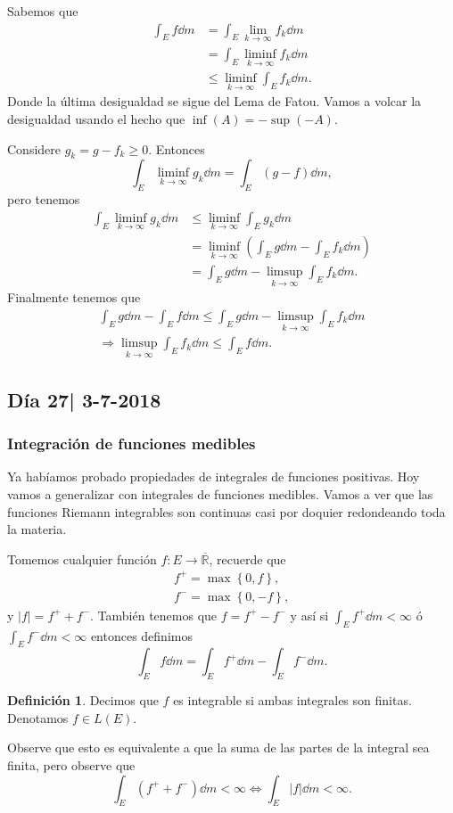 \documentclass[12pt]{article}
\theoremstyle{plain}
\theoremstyle{definition}
\newtheorem{Def}[Th]{Definición}       %
\theoremstyle{remark}
\numberwithin{equation}{section}
\newcommand{\bR}{\mathbb{R}}        %
\renewcommand{\geq}{\geqslant}      %
\renewcommand{\leq}{\leqslant}      %
\renewcommand{\:}{\colon}           %
\newcommand{\conj}[1]{\left\lbrace#1\right\rbrace}
\begin{document}
\begin{multicols}{2}
\begin{ptcbp}
Sabemos que
\begin{align*}
  \int_Ef\dd m &=\int_E\lim_{k\to\infty}f_k\dd m\\
  &=\int_E\liminf_{k\to\infty}f_k\dd m\\
  &\leq \liminf_{k\to\infty}\int_E f_k\dd m.
\end{align*}
Donde la última desigualdad se sigue del Lema de Fatou. Vamos a volcar la desigualdad usando el hecho que $\inf(A)=-\sup(-A)$. \par
Considere $g_k=g-f_k\geq 0$. Entonces
$$\int_E\liminf_{k\to\infty}g_k\dd m=\int_E(g-f)\dd m,$$
pero tenemos
\begin{align*}
  \int_E\liminf_{k\to\infty}g_k\dd m&\leq \liminf_{k\to\infty}\int_Eg_k\dd m\\
  &=\liminf_{k\to\infty}\left(\int_Eg\dd m-\int_Ef_k\dd m\right)\\
  &=\int_Eg\dd m-\limsup_{k\to\infty}\int_Ef_k\dd m.
\end{align*}
Finalmente tenemos que
\begin{gather*}
  \int_Eg\dd m-\int_Ef\dd m\leq \int_Eg\dd m-\limsup_{k\to\infty}\int_Ef_k\dd m\\
  \Rightarrow\limsup_{k\to\infty}\int_Ef_k\dd m\leq \int_Ef\dd m.
\end{gather*}
\end{ptcbp}

\subsection{Día 27| 3-7-2018}

\subsubsection*{Integración de funciones medibles}

Ya habíamos probado propiedades de integrales de funciones positivas. Hoy vamos a generalizar con integrales de funciones medibles. Vamos a ver que las funciones Riemann integrables son continuas casi por doquier redondeando toda la materia.\par
Tomemos cualquier función $f\: E\to\overline{\bR}$, recuerde que
\begin{gather*}
  f^+=\max\conj{0,f},\\
  f^-=\max\conj{0,-f},
\end{gather*}
y $|f|=f^++f^-$. También tenemos que $f=f^+-f^-$ y así si $\int_Ef^+\dd m <\infty$ ó $\int_Ef^-\dd m <\infty$ entonces definimos
$$\int_Ef\dd m=\int_Ef^+\dd m -\int_Ef^-\dd m. $$
\begin{Def}
  Decimos que $f$ es integrable si ambas integrales son finitas. Denotamos $f\in L(E)$.
\end{Def}
Observe que esto es equivalente a que la suma de las partes de la integral sea finita, pero observe que
$$\int_E(f^++f^-)\dd m <\infty \iff \int_E|f|\dd m <\infty.$$


\end{multicols}
\end{document}
